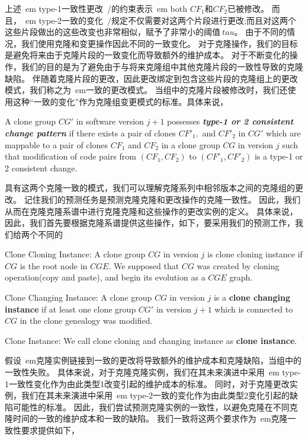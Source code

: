 上述{\ em type-1一致性更改\ /}的约束表示{\ em both} $ CF_1 $和$ CF_2 $已被修改。
而且，{\ em type-2一致的变化\ /}规定不仅需要对这两个片段进行更改;而且对这两个这些片段做出的这些改变也非常相似，赋予了非常小的阈值$ \ tau $。
由于不同的情况，我们使用克隆和变更操作因此不同的一致变化。
对于克隆操作，我们的目标是避免将来由于克隆片段的一致变化而导致额外的维护成本。
对于不断变化的操作，我们的目的是为了避免由于与将来克隆组中其他克隆片段的一致性导致的克隆缺陷。
伴随着克隆片段的更改，因此更改绑定到包含这些片段的克隆组上的更改模式，我们称之为{\ em一致的更改模式}。
当组中的克隆片段被修改时，我们还使用这种“一致的变化”作为克隆组变更模式的标准。具体来说，

\begin{definition} 
A clone group $CG'$ in software version $j+1$ possesses {\em\bf type-1 or 2 consistent change pattern} if there exists a pair of clones $CF'_1,$ and $CF'_2$  in $CG'$ which are mappable to a pair of clones $CF_1$ and $CF_2$ in a clone group $CG$ in version $j$ such that modification of code pairs from $(CF_1,CF_2)$ to $(CF'_1,CF'_2)$ is a type-1 or 2 consistent change. 
\end{definition}

具有这两个克隆一致的模式，我们可以理解克隆系列中相邻版本之间的克隆组的更改。
记住我们的预测任务是预测克隆克隆和更改操作的克隆一致性。
因此，我们从而在克隆克隆系谱中进行克隆克隆和这些操作的更改实例的定义。 具体来说，因此，我们首先要根据克隆系谱提供这些操作，如下，要采用我们的预测工作，我们给两个不同的

\begin{definition} 
Clone Cloning Instance: A clone group $CG$ in version $j$ is clone cloning instance if $CG$ is the root node in $CGE$. We supposed that $CG$ was created by cloning operation(copy and paste), and begin its evolution as a $CGE$ graph.

Clone Changing Instance: A clone group $CG$ in version $j$ is a {\bf clone changing instance} if at least one clone group $CG'$ in version $j+1$ which is connected to $CG$ in the clone genealogy was modified. 

Clone Instance: We call clone cloning and changing instance as {\bf clone instance}.
\end{definition}

假设{\ em克隆实例链接到一致的更改将导致额外的维护成本和克隆缺陷，当组中的一致性失败。}
具体来说，对于克隆克隆实例，我们在其未来演进中采用{\ em type-1一致性变化}作为由此类型1改变引起的维护成本的标准。
同时，对于克隆更改实例，我们在其未来演进中采用{\ em type-2一致的变化}作为由此类型2变化引起的缺陷可能性的标准。
因此，我们尝试预测克隆实例的一致性，以避免克隆在不同克隆时间的一致的维护成本和一致的缺陷。
我们一致将这两个要求作为{\ em克隆一致性要求}提供如下，\\

